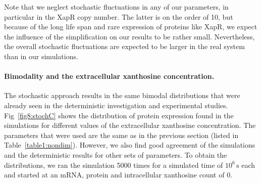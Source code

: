 \documentclass[10pt,letterpaper]{article}
\newcommand{\unit}[1]{\,\mathrm{#1}}
\begin{document}
	Note that we neglect stochastic fluctuations in any of our parameters, in particular in the XapR copy number. The latter is on the order of 10, but because of the long life span and rare expression of proteins like XapR, we expect the influence of the simplification on our results to be rather small. Nevertheless, the overall stochastic fluctuations are expected to be larger in the real system than in our simulations.
	
	\paragraph*{Bimodality and the extracellular xanthosine concentration.}
	The stochastic approach results in the same bimodal distributions that were already
	seen in the deterministic investigation and experimental studies.
	Fig~\ref{fig8:stochC} shows the distribution of protein expression found in
	the simulations for different values of the extracellular xanthosine
	concentration. The parameters that were used are the same as in the previous
	section (listed in Table~\ref{table1:nondim}). However, we also find good agreement of the simulations and the deterministic results for other sets of parameters. To obtain the distributions,
	we ran the simulation 5000 times for a simulated time of $10^6 \unit{s}$
	each and started at an mRNA, protein and intracellular xanthosine count of 0.
	
\end{document}
